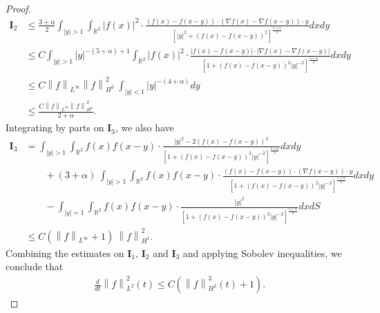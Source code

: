 \documentclass[reqno]{amsart}%
\theoremstyle{definition}
\theoremstyle{remark}
\numberwithin{equation}{section}
\newcommand{\0}{\mathbf{0}}
\newcommand{\1}{\mathbf{1}}
\numberwithin{equation}{section}
\numberwithin{theorem}{section}
\numberwithin{figure}{section}
\begin{document}
\begin{proof}
\begin{equation*}
\begin{split}
\mathbf{I}_2&\leq \frac{3+\alpha}{2}  \int_{ |y| > 1 } \int_{ \mathbb{R}^2 }  |f(x)|^2 \cdot \frac{\left(f(x)-f(x-y)\right)\cdot \left(\nabla f(x)-\nabla f(x-y)\right)\cdot y} {\left[ |y|^2+(f(x)-f(x-y) )^2 \right]^{\frac{5+\alpha}{2}}} dxdy\\
& \leq C  \int_{ |y| > 1 } |y|^{-(5+\alpha)+1} \int_{ \mathbb{R}^2 } |f(x)|^2  \cdot \frac{|f(x)-f(x-y)|\cdot |\nabla f(x)-\nabla f(x-y)|} {\left[ 1+\left(f(x)-f(x-y) \right)^2 |y|^{-2}\right]^{\frac{5+\alpha}{2}}} dxdy\\
 &\leq C \left\|f\right\|_{L^\infty}\left\|f\right\|_{H^2}^2    \ \int_{ |y| < 1 } |y|^{-(4+\alpha)} dy\\
 &\leq \frac{C\left\|f\right\|_{L^\infty}\left\|f\right\|_{H^2}^2}{2+\alpha}.
\end{split}
\end{equation*}
Integrating by parts on $\mathbf{I}_3$, we also have
\begin{equation*}
\begin{split}
\mathbf{I}_3&=  \int_{ |y| > 1 } \int_{ \mathbb{R}^2 } f(x)f(x-y) \cdot \frac{|y|^2 -2\left(f(x)-f(x-y)\right)^2} {\left[ 1+\left(f(x)-f(x-y)\right)^2|y|^{-2}\right]^{\frac{5+\alpha}{2}}} dxdy\\
& \qquad+(3+\alpha) \ \int_{ |y| > 1 } \int_{ \mathbb{R}^2 } f(x)f(x-y) \cdot \frac{(f(x)-f(x-y))\cdot (\nabla f(x-y))\cdot y} {\left[ 1+\left(f(x)-f(x-y)\right)^2|y|^{-2}\right]^{\frac{5+\alpha}{2}}} dxdy\\
& \qquad-\int_{ |y| = 1 } \int_{ \mathbb{R}^2 } f(x)f(x-y) \cdot \frac{|y|^2 } {\left[ 1+\left(f(x)-f(x-y)\right)^2|y|^{-2}\right]^{\frac{3+\alpha}{2}}}dxdS \\
 &\leq C \left(\left\|f\right\|_{L^\infty} +1\right) \     \left\|f\right\|_{H^1}^2.
\end{split}
\end{equation*}
Combining the estimates on $\mathbf{I}_1$, $\mathbf{I}_2$ and $\mathbf{I}_3$ and applying Sobolev inequalities, we conclude that
\begin{align}\label{L2 estimate}
\frac{d}{dt}  \left\|f\right\|_{L^2}^2(t) \leq C (\left\|f\right\|_{H^2}^3(t)+1).
\end{align}


\end{proof}
\end{document}
